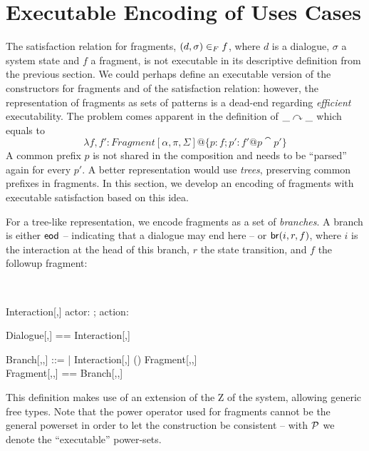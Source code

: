\section{Executable Encoding of Uses Cases}

The satisfaction relation for fragments, $(d,\sigma) \in_{F} f$, where
$d$ is a dialogue, $\sigma$ a system state and $f$ a fragment, is not
executable in its descriptive definition from the previous section.
We could perhaps define an executable version of the constructors for
fragments and of the satisfaction relation: however, the
representation of fragments as sets of patterns is a dead-end
regarding \emph{efficient} executability.  The problem comes apparent
in the definition of $\_ \curvearrowright \_$ which equals to $$\lambda f,f':
Fragment[\alpha,\pi,\Sigma] @ \{ p: f; p': f' @ p \cat p' \}$$
A
common prefix $p$ is not shared in the composition and needs to be
``parsed'' again for every $p'$. A better representation would use
\emph{trees}, preserving common prefixes in fragments.  In this
section, we develop an encoding of fragments with executable
satisfaction based on this idea.

For a tree-like representation, we encode fragments as a set of
\emph{branches}. A branch is either ${\mathsf{eod}}$ -- indicating that a
dialogue may end here -- or ${\mathsf{br}}(i,r,f)$, where $i$ is the interaction
at the head of this branch, $r$ the state transition, and $f$ the
followup fragment:

\renewcommand{\assumed}{}

\begin{zedgroup}
\begin{zdirectives}
\end{zdirectives} \\


\begin{schema}{Interaction[\alpha,\pi]}
  actor: \alpha; action: \pi
\end{schema}
\begin{zed}
  Dialogue[\alpha,\pi] == \assumed \seq Interaction[\alpha,\pi] 
\end{zed}
\begin{zed}
  Branch[\alpha,\pi,\Sigma] ::= %
    \uceod | 
    \ucbr \ldata \assumed Interaction[\alpha,\pi] \cross
                    (\Sigma \rel \Sigma) \cross
                    Fragment[\alpha,\pi,\Sigma] \rdata \\
  Fragment[\alpha,\pi,\Sigma] == 
    \assumed \cpower Branch[\alpha,\pi,\Sigma] \\
\end{zed}
\end{zedgroup}
\noindent
This definition makes use of an extension of the Z of the \Zeta{}
system, allowing generic free types. Note that the power operator used for
fragments cannot be the general powerset in order to let the
construction be consistent -- with ${\cal{P}}$ we denote the
``executable'' power-sets.

